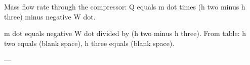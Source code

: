 Mass flow rate through the compressor:  
Q equals m dot times (h two minus h three) minus negative W dot.  

m dot equals negative W dot divided by (h two minus h three).  
From table: h two equals (blank space), h three equals (blank space).  

---
